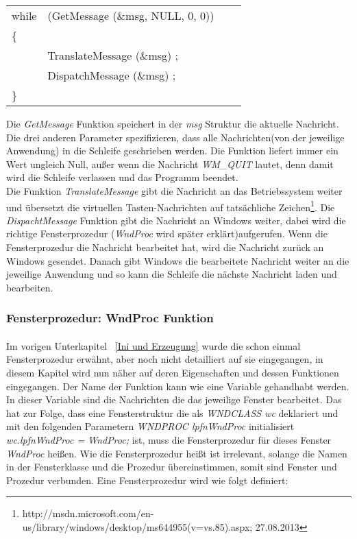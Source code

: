 \begin{tabular}{llll}
while & (GetMessage (\&msg, NULL, 0, 0))\\
\{\\
     & TranslateMessage (\&msg) ;\\
     & DispatchMessage (\&msg) ;\\
\}\\
\end{tabular}

Die \textit{GetMessage} Funktion speichert in der \textit{msg} Struktur die aktuelle Nachricht. Die drei anderen Parameter spezifizieren, dass alle Nachrichten(von der jeweilige Anwendung) in die Schleife geschrieben werden. Die Funktion liefert immer ein Wert ungleich Null, außer wenn die Nachricht \textit{WM\_QUIT} lautet, denn damit wird die Schleife verlassen und das Programm beendet.
\\
Die Funktion \textit{TranslateMessage} gibt die Nachricht an das Betriebssystem weiter und übersetzt die virtuellen Tasten-Nachrichten auf tatsächliche Zeichen\footnote{http://msdn.microsoft.com/en-us/library/windows/desktop/ms644955(v=vs.85).aspx; 27.08.2013}. Die \textit{DispachtMessage} Funktion gibt die Nachricht an Windows weiter, dabei wird die richtige Fensterprozedur (\textit{WndProc} wird später erklärt)aufgerufen. Wenn die Fensterprozedur die Nachricht bearbeitet hat, wird die Nachricht zurück an Windows gesendet.  Danach gibt Windows die bearbeitete Nachricht weiter an die jeweilige Anwendung und so kann die Schleife die nächste Nachricht laden und bearbeiten.



\subsubsection{Fensterprozedur: WndProc Funktion}
\paragraph{}

Im vorigen Unterkapitel ~\ref{Ini und Erzeugung} wurde die schon einmal Fensterprozedur erwähnt, aber noch nicht detailliert auf sie eingegangen, in diesem Kapitel wird nun näher auf deren Eigenschaften und dessen Funktionen eingegangen. Der Name der Funktion kann wie eine Variable gehandhabt werden. In dieser Variable sind die Nachrichten die das jeweilige Fenster bearbeitet. Das hat zur Folge, dass eine Fensterstruktur die als \textit{WNDCLASS wc} deklariert und mit den folgenden Parametern \textit{WNDPROC lpfnWndProc} initialisiert \textit{wc.lpfnWndProc = WndProc;} ist, muss die Fensterprozedur für dieses Fenster \textit{WndProc} heißen. Wie die Fensterprozedur heißt ist irrelevant, solange die Namen in der Fensterklasse und die Prozedur übereinstimmen, somit sind Fenster und Prozedur verbunden. Eine Fensterprozedur wird wie folgt definiert:

